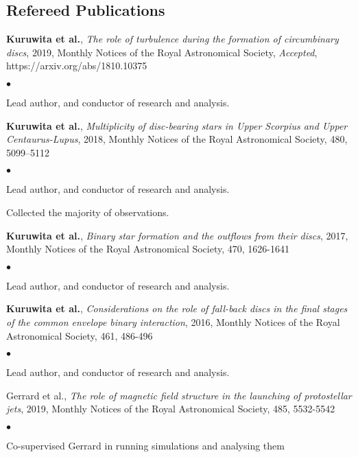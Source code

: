 \documentclass[margin,line]{res}
\newenvironment{list1}{
	\begin{list}{\ding{113}}{%
			\setlength{\itemsep}{0in}
			\setlength{\parsep}{0in} \setlength{\parskip}{0in}
			\setlength{\topsep}{0in} \setlength{\partopsep}{0in} 
			\setlength{\leftmargin}{0.17in}}}{\end{list}}
\newenvironment{list2}{
	\begin{list}{$\bullet$}{%
			\setlength{\itemsep}{0in}
			\setlength{\parsep}{0in} \setlength{\parskip}{0in}
			\setlength{\topsep}{0in} \setlength{\partopsep}{0in} 
			\setlength{\leftmargin}{0.2in}}}{\end{list}}
\begin{document}
\begin{resume}
\section{\sc Refereed Publications}
\begin{list1}
	\item[] {\bf Kuruwita et al.}, \emph{The role of turbulence during the formation of circumbinary discs}, 2019, Monthly Notices of the Royal Astronomical Society, \emph{Accepted}, https://arxiv.org/abs/1810.10375
	\begin{list2}
		\item Lead author, and conductor of research and analysis.\\
	\end{list2}
	\item[] {\bf Kuruwita et al.}, \emph{Multiplicity of disc-bearing stars in Upper Scorpius and Upper Centaurus-Lupus}, 2018, Monthly Notices of the Royal Astronomical Society, 480, 5099–5112
	\begin{list2}
		\item Lead author, and conductor of research and analysis.
		\item Collected the majority of observations.\\
	\end{list2}
	\item[] {\bf Kuruwita et al.}, \emph{Binary star formation and the outflows from their discs}, 2017, Monthly Notices of the Royal Astronomical Society, 470, 1626-1641
	\begin{list2}
		\item Lead author, and conductor of research and analysis.\\
	\end{list2}
	\item[] {\bf Kuruwita et al.}, \emph{Considerations on the role of fall-back discs in the final stages of the common envelope binary interaction}, 2016, Monthly Notices of the Royal Astronomical Society, 461, 486-496
	\begin{list2}
		\item Lead author, and conductor of research and analysis.\\
	\end{list2}
	\item[] Gerrard et al., \emph{The role of magnetic field structure in the launching of protostellar jets}, 2019, Monthly Notices of the Royal Astronomical Society, 485, 5532-5542
	\begin{list2}
		\item Co-supervised Gerrard in running simulations and analysing them\\

\end{list2}
\end{list1}
\end{resume}
\end{document}
